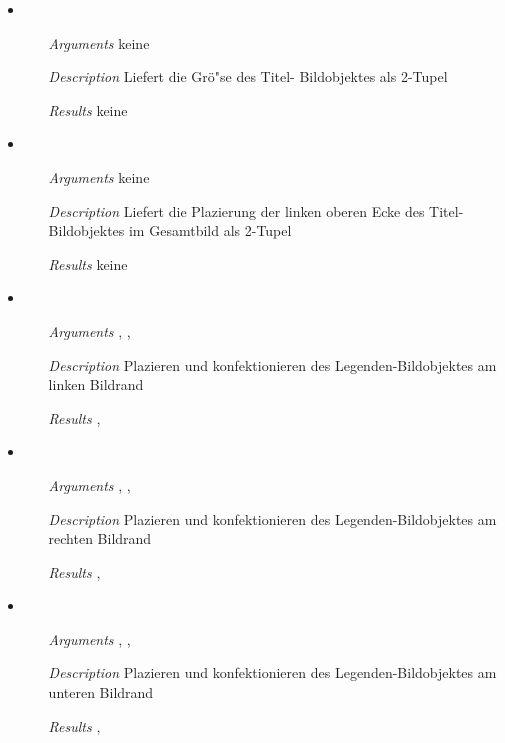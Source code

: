 \begin{description}
\begin{itemize}
\item {}
\begin{enumerate}
\item[\textit{Arguments}] keine
\item[\textit{Description}] Liefert die Gr\"o"se des Titel-
  Bildobjektes als 2-Tupel
\item[\textit{Results}] keine
\end{enumerate}

\item {}
\begin{enumerate}
\item[\textit{Arguments}] keine
\item[\textit{Description}] Liefert die Plazierung der linken oberen
  Ecke des Titel-Bildobjektes im Gesamtbild als 2-Tupel
\item[\textit{Results}] keine
\end{enumerate}

\item {}
\begin{enumerate}
\item[\textit{Arguments}] , ,
\item[\textit{Description}] Plazieren und konfektionieren des
  Legenden-Bildobjektes am linken Bildrand
\item[\textit{Results}] ,
\end{enumerate}

\item {}
\begin{enumerate}
\item[\textit{Arguments}] , ,
\item[\textit{Description}] Plazieren und konfektionieren des
  Legenden-Bildobjektes am rechten Bildrand
\item[\textit{Results}] ,
\end{enumerate}

\item {}
\begin{enumerate}
\item[\textit{Arguments}] , ,
\item[\textit{Description}] Plazieren und konfektionieren des
  Legenden-Bildobjektes am unteren Bildrand
\item[\textit{Results}] ,
\end{enumerate}


\end{itemize}
\end{description}
